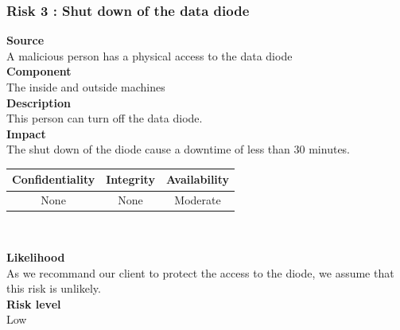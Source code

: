\documentclass[a4paper,11pt]{article}
\begin{document}
\subsubsection{Risk 3 : Shut down of the data diode }
\textbf{Source} \\A malicious person has a physical access to the data diode\\
\textbf{Component} \\The inside and outside machines\\
\textbf{Description}\\ This person can turn off the data diode. \\
\textbf{Impact}\\
The shut down of the diode cause a downtime of less than 30 minutes.\\
\begin{center}
\begin{tabular}{|c|c|c|}
\hline
\textbf{Confidentiality} & \textbf{Integrity} & \textbf{Availability} \\
\hline
None & None & Moderate \\
\hline
\end{tabular}\\
\end{center}
\textbf{Likelihood}\\ As we recommand our client to protect the access to the diode, we assume that this risk is unlikely.\\
\textbf{Risk level}\\Low\\
\end{document}
